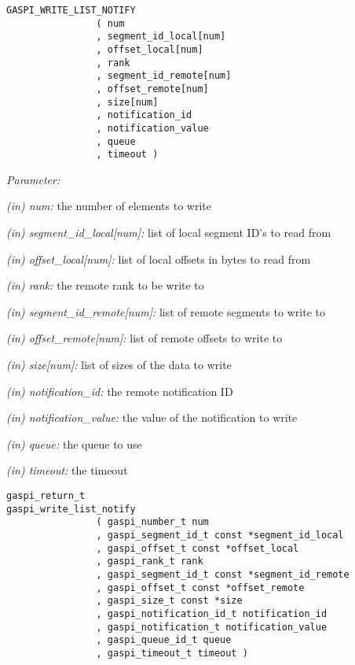 \documentclass[a4paper]{article}
\newlength{\st}\setlength{\st}{0pt}
\newcommand{\parameter}[1]{{\it #1}}
\newenvironment{cbox}[1]
{\newcommand\colboxcolor{#1}\begin{lrbox}{\riddlebox}\begin{minipage}{\dimexpr\columnwidth-2\fboxsep\relax}}
{\end{minipage}\end{lrbox}\begin{center}\colorbox[HTML]{\colboxcolor}{\usebox{\riddlebox}}\end{center}}
\newcommand{\shortlistbegin}[1]{\begin{trivlist}\setlength{\itemsep}{0pt}\item[]\emph{#1:}}
\newcommand{\shortlistitem}[1]{\item[]#1}
\newcommand{\shortlistend}{\end{trivlist}}
\newenvironment{FDef}{\begin{trivlist}\item[]}{\end{trivlist}}
\newenvironment{FDefSign}{\begin{cbox}{EEEEEE}}{\end{cbox}}
\newcommand{\parameterlistbegin}{\shortlistbegin{Parameter}}
\newcommand{\parameterlistend}{\shortlistend}
\newcommand{\parameterlistitem}[3]{\shortlistitem{\parameter{(#1) #2:} {#3}}}
\begin{document}
\begin{FDef}
\begin{FDefSign}
\begin{verbatim}
GASPI_WRITE_LIST_NOTIFY
                ( num
                , segment_id_local[num]
                , offset_local[num]
                , rank
                , segment_id_remote[num]
                , offset_remote[num]
                , size[num]
                , notification_id
                , notification_value
                , queue
                , timeout )
\end{verbatim}
\end{FDefSign}

\parameterlistbegin
\parameterlistitem{in}{num}{the number of elements to write}
\parameterlistitem{in}{segment\_id\_local[num]}{list of local segment ID's to read from}
\parameterlistitem{in}{offset\_local[num]}{list of local offsets in bytes to read from}
\parameterlistitem{in}{rank}{the remote rank to be write to}
\parameterlistitem{in}{segment\_id\_remote[num]}{list of remote segments to write to}
\parameterlistitem{in}{offset\_remote[num]}{list of remote offsets to write to}
\parameterlistitem{in}{size[num]}{list of sizes of the data to write}
\parameterlistitem{in}{notification\_id}{the remote notification ID}
\parameterlistitem{in}{notification\_value}{the value of the notification to write}
\parameterlistitem{in}{queue}{the queue to use}
\parameterlistitem{in}{timeout}{the timeout}
\parameterlistend


\begin{FDefSign}
\begin{verbatim}
gaspi_return_t
gaspi_write_list_notify
                ( gaspi_number_t num
                , gaspi_segment_id_t const *segment_id_local
                , gaspi_offset_t const *offset_local
                , gaspi_rank_t rank
                , gaspi_segment_id_t const *segment_id_remote
                , gaspi_offset_t const *offset_remote
                , gaspi_size_t const *size
                , gaspi_notification_id_t notification_id
                , gaspi_notification_t notification_value
                , gaspi_queue_id_t queue
                , gaspi_timeout_t timeout )
\end{verbatim}
\end{FDefSign}



\end{FDef}
\end{document}
